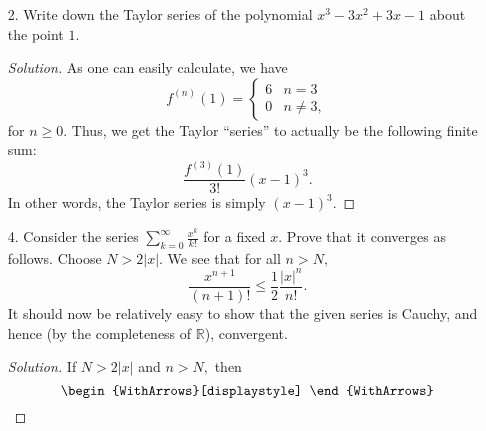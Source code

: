 \documentclass[12pt]{article}
\newcommand{\md}[1]{\left\lvert #1 \right\lvert}
\theoremstyle{definition}
\newenvironment{soln}{\begin{proof}[Solution]}{\end{proof}}
\begin{document}
\begin{itemize}
\begin{soln}
			Once again, note that
			\begin{equation*} 
				g(t) = 1 - t^2 + t^4 - \cdots.
			\end{equation*}
			For $n \ge 1,$ we note that
			\begin{align*} 
				g(t) &= [1 - t^2 + \cdots + (-1)^nt^{2n}] + {\color{red}(-1)^{n+1}t^{2n + 2}[1 - t^2 + \cdots]}\\
				&= [1 - t^2 + \cdots + (-1)^nt^{2n}] + {\color{red}(-1)^{n+1}\dfrac{t^{2n + 2}}{1 + t^2}}
			\end{align*}
			Integrating both sides from $0$ to $x$ gives
			\begin{equation*} 
				f(x) = P_{2n + 1}(x) + {\color{red}(-1)^{n+1}\int_{0}^{x} \dfrac{t^{2n + 2}}{1 + t^2} {\mathrm{d}}t}.
			\end{equation*}
			Thus, the term in red is the $(2n + 1)$-th remainder $R_{2n + 1}(x).$ Conclude as before, for $R_{2n}(x).$
		\end{soln}
		\newpage
		\item[2.]  Write down the Taylor series of the polynomial $x^3 - 3x^2 + 3x - 1$ about the point $1.$
		\begin{soln}
			As one can easily calculate, we have
			\begin{equation*} 
				f^{(n)}(1) = \begin{cases}
					6 & n = 3\\
					0 & n \neq 3,
				\end{cases}
			\end{equation*}
			for $n \ge 0.$ Thus, we get the Taylor ``series'' to actually be the following finite sum:
			\begin{equation*} 
				\dfrac{f^{(3)}(1)}{3!}(x - 1)^3.
			\end{equation*}
			In other words, the Taylor series is simply $(x - 1)^3.$
		\end{soln}
		\newpage
		\item[4.] Consider the series $\sum_{k = 0}^{\infty}\frac{x^k}{k!}$ for a fixed $x.$ Prove that it converges as follows. Choose $N > 2\md{x}.$ We see that for all $n > N,$
		\begin{equation*} 
			\dfrac{x^{n + 1}}{(n + 1)!} \le \dfrac{1}{2}\dfrac{\md{x}^n}{n!}.
		\end{equation*}
		It should now be relatively easy to show that the given series is Cauchy, and hence (by the completeness of $\mathbb{R}$), convergent.
		\begin{soln}
			If $N > 2\md{x}$ and $n > N,$ then
			\[\begin{WithArrows}[displaystyle]

\end{WithArrows}\]
\end{soln}
\end{itemize}
\end{document}
